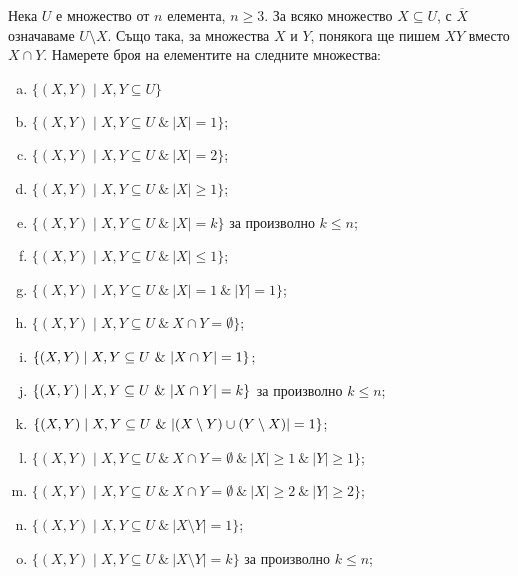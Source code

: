 \begin{problem} %
  Нека $U$ е множество от $n$ елемента, $n\geq 3$. За всяко множество $X\subseteq U$, с $\overline{X}$ означаваме $U\setminus X$.
  Също така, за множества $X$ и $Y$, понякога ще пишем $XY$ вместо $X \cap Y$.
  Намерете броя на елементите на следните множества:
  \begin{enumerate}[a)]
  \item
    $\{(X,Y) \mid X,Y\subseteq U\}$
  \item
    $\{(X,Y) \mid X,Y\subseteq U\ \&\ \vert{X}\vert = 1\}$;
  \item
    $\{(X,Y) \mid X,Y\subseteq U\ \&\ \vert{X}\vert = 2\}$;
  \item
    $\{(X,Y) \mid X,Y\subseteq U\ \&\ \vert{X}\vert \geq 1\}$;
  \item
    $\{(X,Y) \mid X,Y\subseteq U\ \&\ \vert{X}\vert = k\}$ за произволно $k \leq n$;
  \item
    $\{(X,Y) \mid X,Y\subseteq U\ \&\ \vert{X}\vert \leq 1\}$;
  \item
    $\{(X,Y) \mid X,Y\subseteq U\ \&\ \vert{X}\vert = 1\ \&\ \vert{Y}\vert = 1\}$;
  \item
    $\{(X,Y) \mid X,Y\subseteq U\ \&\ X \cap Y = \emptyset\}$;
  \item
    $\{(X,Y) \mid X,Y\subseteq U\ \&\ \abs{X \cap Y} = 1\}$;
  \item
    $\{(X,Y) \mid X,Y\subseteq U\ \&\ \abs{X \cap Y} = k\}$ за произволно $k \leq n$;
  \item
    $\{(X,Y) \mid X,Y\subseteq U\ \&\ \abs{(X\setminus Y) \cup (Y\setminus X)} = 1\}$;
  \item
    $\{(X,Y) \mid X,Y\subseteq U\ \&\ X\cap Y = \emptyset\ \&\ |X|\geq 1\ \&\ |Y|\geq 1\}$;
  \item
    $\{(X,Y) \mid X,Y\subseteq U\ \&\ X\cap Y = \emptyset\ \&\ |X|\geq 2\ \&\ |Y|\geq 2\}$;
  \item
    $\{(X,Y) \mid X,Y\subseteq U\ \&\ |X\setminus Y| = 1\}$;
  \item
    $\{(X,Y) \mid X,Y\subseteq U\ \&\ |X\setminus Y| = k\}$ за произволно $k \leq n$;

\end{enumerate}
\end{problem}
